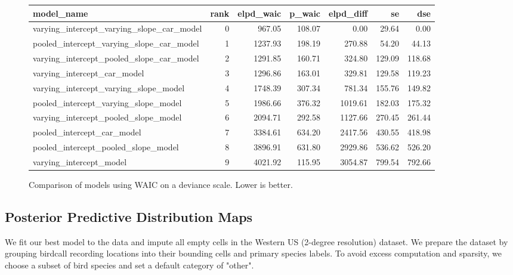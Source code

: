 \documentclass[notitlepage]{article}
\begin{document}
\begin{figure}[H]
\centering
\begin{tabular}{lrrrrrr}
\toprule
model\_name &  rank &  elpd\_waic &  p\_waic &  elpd\_diff &      se &     dse \\
\midrule
varying\_intercept\_varying\_slope\_car\_model &     0 &     967.05 &  108.07 &       0.00 &   29.64 &    0.00 \\
pooled\_intercept\_varying\_slope\_car\_model  &     1 &    1237.93 &  198.19 &     270.88 &   54.20 &   44.13 \\
varying\_intercept\_pooled\_slope\_car\_model  &     2 &    1291.85 &  160.71 &     324.80 &  129.09 &  118.68 \\
varying\_intercept\_car\_model                   &     3 &    1296.86 &  163.01 &     329.81 &  129.58 &  119.23 \\
varying\_intercept\_varying\_slope\_model     &     4 &    1748.39 &  307.34 &     781.34 &  155.76 &  149.82 \\
pooled\_intercept\_varying\_slope\_model      &     5 &    1986.66 &  376.32 &    1019.61 &  182.03 &  175.32 \\
varying\_intercept\_pooled\_slope\_model      &     6 &    2094.71 &  292.58 &    1127.66 &  270.45 &  261.44 \\
pooled\_intercept\_car\_model                    &     7 &    3384.61 &  634.20 &    2417.56 &  430.55 &  418.98 \\
pooled\_intercept\_pooled\_slope\_model       &     8 &    3896.91 &  631.80 &    2929.86 &  536.62 &  526.20 \\
varying\_intercept\_model                       &     9 &    4021.92 &  115.95 &    3054.87 &  799.54 &  792.66 \\
\bottomrule
\end{tabular}
\caption{Comparison of models using WAIC on a deviance scale. Lower is better.}
\label{table:waic_comparison}
\end{figure}

\subsection{Posterior Predictive Distribution Maps}

We fit our best model to the data and impute all empty cells in the Western US (2-degree resolution) dataset.
We prepare the dataset by grouping birdcall recording locations into their bounding cells and primary species labels.
To avoid excess computation and sparsity, we choose a subset of bird species and set a default category of "other".
\end{document}
